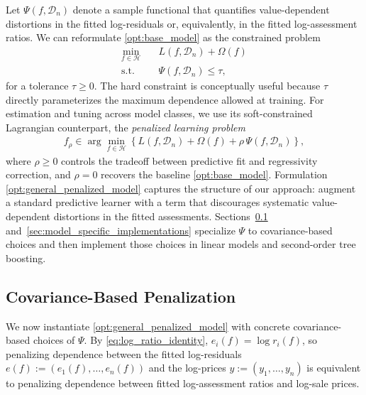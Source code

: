 \documentclass[12pt]{article}
\theoremstyle{plain}
\theoremstyle{definition}
\newcommand{\1}{\mathbf{1}}
\newcommand{\D}{\mathcal{D}}
\renewcommand{\H}{\mathcal{H}}
\begin{document}
Let $\Psi(f,\D_n)$ denote a sample functional that quantifies value-dependent distortions in the fitted log-residuals or, equivalently, in the fitted log-assessment ratios. We can reformulate \eqref{opt:base_model} as the constrained problem
\begin{align}
\label{opt:general_constrained_model}
\min_{f\in\H}
\quad
& L(f, \D_n)+\Omega(f)
\\
\text{s.t.}\quad
& \Psi(f, \D_n)\le \tau,
\nonumber
\end{align}
for a tolerance $\tau\ge 0$. The hard constraint is conceptually useful because $\tau$ directly parameterizes the maximum dependence allowed at training. For estimation and tuning across model classes, we use its soft-constrained Lagrangian counterpart, the \emph{penalized learning problem}
\begin{align}
\label{opt:general_penalized_model}
f_\rho
\in
\arg\min_{f\in\H}
\left\{
L(f, \D_n)+\Omega(f)+\rho\,\Psi(f, \D_n)
\right\},
\end{align}
where $\rho\ge 0$ controls the tradeoff between predictive fit and regressivity correction, and $\rho=0$ recovers the baseline \eqref{opt:base_model}. Formulation \eqref{opt:general_penalized_model} captures the structure of our approach: augment a standard predictive learner with a term that discourages systematic value-dependent distortions in the fitted assessments. Sections~\ref{sec:covariance_penalty_learning} and~\ref{sec:model_specific_implementations} specialize $\Psi$ to covariance-based choices and then implement those choices in linear models and second-order tree boosting.



\subsection{Covariance-Based Penalization}
\label{sec:covariance_penalty_learning}

We now instantiate \eqref{opt:general_penalized_model} with concrete covariance-based choices of $\Psi$. By \eqref{eq:log_ratio_identity}, $e_i(f)=\log r_i(f)$, so penalizing dependence between the fitted log-residuals $e(f):=(e_1(f),\dots,e_n(f))$ and the log-prices $y:=(y_1,\dots,y_n)$ is equivalent to penalizing dependence between fitted log-assessment ratios and log-sale prices.
\end{document}
